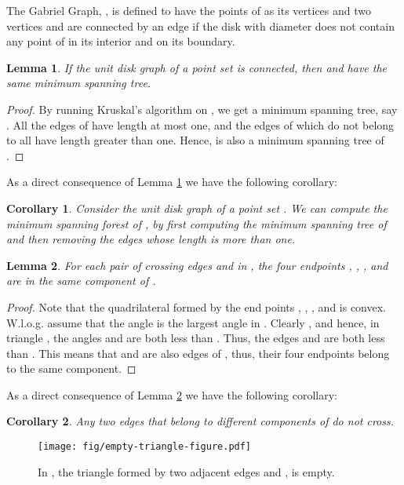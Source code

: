 \documentclass[11pt,a4paper]{article}
\newtheorem{lemma}{Lemma}
\newtheorem{corollary}{Corollary}
\begin{document}
The Gabriel Graph, , is defined to have the points of  as its vertices and two vertices  and  are connected by an edge if the disk with diameter  does not contain any point of  in its interior and on its boundary.

\begin{lemma}
\label{MST-UDG}
If the unit disk graph  of a point set  is connected, then  and  have the same minimum spanning tree.
\end{lemma}
\begin{proof}
 By running Kruskal's algorithm on , we get a minimum spanning tree, say . All the edges of  have length at most one, and the edges of  which do not belong to  all have length greater than one. Hence,  is also a minimum spanning tree of .
\end{proof}

As a direct consequence of Lemma \ref{MST-UDG} we have the following corollary:

\begin{corollary}
\label{MST-DEL}
Consider the unit disk graph  of a point set . We can compute the minimum spanning forest of , by first computing the minimum spanning tree of  and then removing the edges whose length is more than one.
\end{corollary}

\begin{lemma}
\label{same-component}
 For each pair of crossing edges  and  in , the four endpoints , , , and  are in the same component of . 
\end{lemma}
\begin{proof}
Note that the quadrilateral  formed by the end points , , , and  is convex. W.l.o.g. assume that the angle  is the largest angle in . Clearly , and hence, in triangle , the angles  and  are both less than . Thus, the edges  and  are both less than . This means that  and  are also edges of , thus, their four endpoints belong to the same component.  
\end{proof}

As a direct consequence of Lemma \ref{same-component} we have the following corollary: 

\begin{corollary}
\label{non-crossing-edges}
Any two edges that belong to different components of  do not cross.
\end{corollary}

\begin{figure}[ht]
  \centering
    \texttt{[image: fig/empty-triangle-figure.pdf]}
  \caption{In , the triangle  formed by two adjacent edges  and , is empty.}
\label{empty-triangle-figure}
\end{figure}
\end{document}
